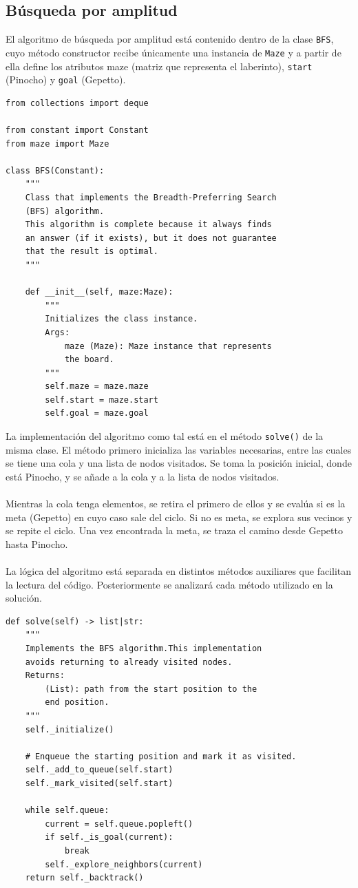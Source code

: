 \documentclass[12pt, letterpaper]{article}
\begin{document}
\subsection{Búsqueda por amplitud}
El algoritmo de búsqueda por amplitud está contenido dentro de la clase \lstinline{BFS}, cuyo método constructor recibe únicamente una instancia de \lstinline{Maze} y a partir de ella define los atributos maze (matriz que representa el laberinto), \lstinline{start} (Pinocho) y \lstinline{goal} (Gepetto).\\
\begin{lstlisting}
from collections import deque

from constant import Constant
from maze import Maze

class BFS(Constant):
    """
    Class that implements the Breadth-Preferring Search
    (BFS) algorithm.
    This algorithm is complete because it always finds
    an answer (if it exists), but it does not guarantee
    that the result is optimal.
    """

    def __init__(self, maze:Maze):
        """
        Initializes the class instance.
        Args:
            maze (Maze): Maze instance that represents
            the board.
        """
        self.maze = maze.maze
        self.start = maze.start
        self.goal = maze.goal
\end{lstlisting}
\clearpage
La implementación del algoritmo como tal está en el método \lstinline{solve()} de la misma clase. El método primero inicializa las variables necesarias, entre las cuales se tiene una cola y una lista de nodos visitados. Se toma la posición inicial, donde está Pinocho, y se añade a la cola y a la lista de nodos visitados.\\\\
Mientras la cola tenga elementos, se retira el primero de ellos y se evalúa si es la meta (Gepetto) en cuyo caso sale del ciclo. Si no es meta, se explora sus vecinos y se repite el ciclo. Una vez encontrada la meta, se traza el camino desde Gepetto hasta Pinocho.\\\\
La lógica del algoritmo está separada en distintos métodos auxiliares que facilitan la lectura del código. Posteriormente se analizará cada método utilizado en la solución.\\
\begin{lstlisting}
def solve(self) -> list|str:
    """
    Implements the BFS algorithm.This implementation
    avoids returning to already visited nodes.
    Returns:
        (List): path from the start position to the
        end position.
    """
    self._initialize()

    # Enqueue the starting position and mark it as visited.
    self._add_to_queue(self.start)
    self._mark_visited(self.start)

    while self.queue:
        current = self.queue.popleft()
        if self._is_goal(current):
            break
        self._explore_neighbors(current)
    return self._backtrack()
\end{lstlisting}
\end{document}
